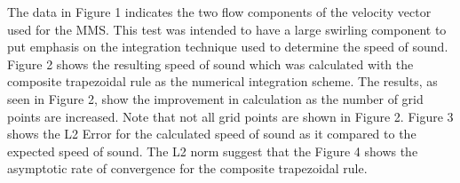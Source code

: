 \documentclass[12pt]{article}
\begin{document}
\begin{figure}
    \begin{center}
        \scalebox{0.75}{}
    \end{center}
\end{figure}

\begin{figure}
    \begin{center}
        \scalebox{0.75}{}
    \end{center}
\end{figure}

\begin{figure}
    \begin{center}
        \scalebox{0.75}{}
    \end{center}
\end{figure}

\begin{figure}
    \begin{center}
        \scalebox{0.75}{}
    \end{center}
\end{figure}

\begin{figure}
    \begin{center}
        \scalebox{0.75}{}
    \end{center}
\end{figure}

\begin{figure}
    \begin{center}
        \scalebox{0.75}{}
    \end{center}
\end{figure}

\begin{figure}
    \begin{center}
        \scalebox{0.75}{}
    \end{center}
\end{figure}


The data in Figure 1 indicates the two flow components of the velocity vector 
used for the MMS. This test was intended to have a large swirling component to
put emphasis on the integration technique used to determine the speed of sound.
Figure 2 shows the resulting speed of sound which was calculated
with the composite trapezoidal rule as the numerical integration scheme. The 
results, as seen in Figure 2, show the improvement in calculation as the number 
of grid points are increased. Note that not all grid points are shown in Figure 2. 
Figure 3 shows the L2 Error for the calculated speed of sound as it compared to the 
expected speed of sound. The L2 norm suggest that the  Figure 4 shows the asymptotic rate of convergence for
the composite trapezoidal rule.
\end{document}

